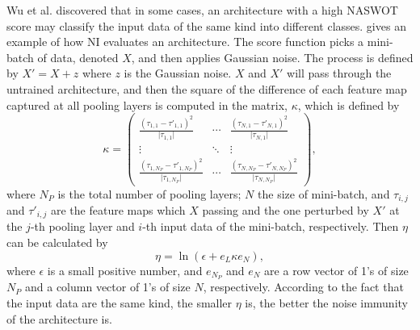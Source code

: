 \documentclass[sigconf]{acmart}
\begin{document}
    Wu et al. \cite{10092788} discovered that in some cases, an architecture with a high %
    NASWOT score may classify the input data of the same kind into different classes. 
     gives an example of how NI evaluates an architecture. 
    The score function picks a mini-batch of data, denoted $X$, and then applies 
    Gaussian noise. The process is defined by $X'=X+z$ where $z$ is the 
    Gaussian noise. $X$ and $X'$ will pass through the untrained architecture, 
    and then the square of the difference of each feature map captured at all 
    pooling layers is computed in the matrix, $\kappa$, which is defined by 
    \begin{equation}
        \label{equ:ni_kappa}
        \kappa=\begin{pmatrix}\frac{(\tau_{1,1}-\tau'_{1,1})^2}{\lvert \tau_{1,1}\rvert}&\cdots&\frac{(\tau_{N,1}-\tau'_{N,1})^2}{\lvert \tau_{N,1}\rvert}\\\vdots&\ddots&\vdots\\\frac{(\tau_{1,N_P}-\tau'_{1,N_P})^2}{\lvert \tau_{1,N_P}\rvert}&\cdots&\frac{(\tau_{N,N_P}-\tau'_{N,N_P})^2}{\lvert \tau_{N,N_P}\rvert}\end{pmatrix},
    \end{equation}
    where $N_P$ is the total number of pooling layers; $N$ the size of mini-batch, 
    and $\tau_{i,j}$ and $\tau'_{i,j}$ are the feature maps which $X$ passing and 
    the one perturbed by $X'$ at the $j$-th pooling layer and $i$-th input 
    data of the mini-batch, respectively. Then $\eta$ can be calculated by 
    \begin{equation}
        \label{equ:ni_eta}
        \eta=\ln(\epsilon+e_L\kappa e_N),
    \end{equation}
    where $\epsilon$ is a small positive number, and $e_{N_P}$ and $e_N$ are a row 
    vector of 1's of size $N_P$ and a column vector of 1's of size $N$, respectively. 
    According to the fact that the input data are the same kind, the smaller $\eta$ 
    is, the better the noise immunity of the architecture is. 
\end{document}
